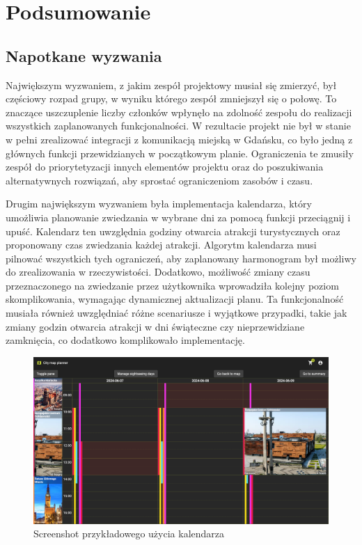 
\chapter{Podsumowanie}
\label{ch:podsumowanie}

\section{Napotkane wyzwania}
\label{sec:napotkane-wyzwania}

Największym wyzwaniem, z jakim zespół projektowy musiał się zmierzyć, był częściowy rozpad grupy, w wyniku którego zespół zmniejszył się o połowę.
To znaczące uszczuplenie liczby członków wpłynęło na zdolność zespołu do realizacji wszystkich zaplanowanych funkcjonalności.
W rezultacie projekt nie był w stanie w pełni zrealizować integracji z komunikacją miejską w Gdańsku, co było jedną z głównych funkcji przewidzianych w początkowym planie.
Ograniczenia te zmusiły zespół do priorytetyzacji innych elementów projektu oraz do poszukiwania alternatywnych rozwiązań, aby sprostać ograniczeniom zasobów i czasu.

Drugim największym wyzwaniem była implementacja kalendarza, który umożliwia planowanie zwiedzania w wybrane dni za pomocą funkcji przeciągnij i upuść.
Kalendarz ten uwzględnia godziny otwarcia atrakcji turystycznych oraz proponowany czas zwiedzania każdej atrakcji.
Algorytm kalendarza musi pilnować wszystkich tych ograniczeń, aby zaplanowany harmonogram był możliwy do zrealizowania w rzeczywistości.
Dodatkowo, możliwość zmiany czasu przeznaczonego na zwiedzanie przez użytkownika wprowadziła kolejny poziom skomplikowania, wymagając dynamicznej aktualizacji planu.
Ta funkcjonalność musiała również uwzględniać różne scenariusze i wyjątkowe przypadki, takie jak zmiany godzin otwarcia atrakcji w dni świąteczne czy nieprzewidziane zamknięcia, co dodatkowo komplikowało implementację.

\begin{figure}[H]
    \centering
    \includegraphics[width=1\textwidth]{attachments/t1}
    \caption{Screenshot przykładowego użycia kalendarza}
\end{figure}

